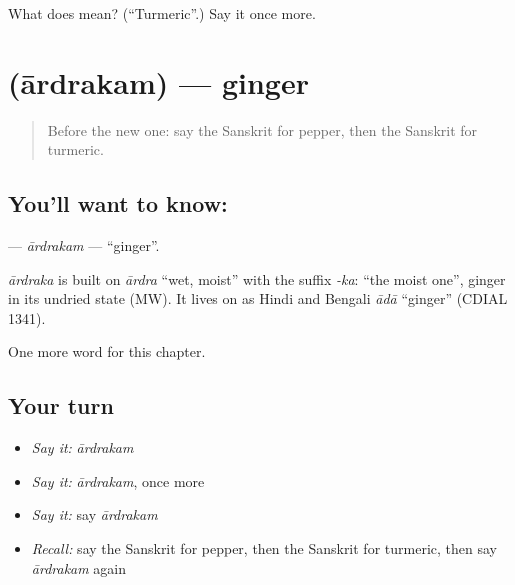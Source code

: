 \begin{tcolorbox}[breakable,colback=teal!4,colframe=teal!35!black,title={Before you move on}]
What does  mean? (\textquotedblleft{}Turmeric\textquotedblright{}.) Say it once more.
\end{tcolorbox}
\section[\texorpdfstring{\sk{आर्द्रकम्} (ārdrakam)}{आर्द्रकम् (ārdrakam)}]{ (ārdrakam) — ginger}

\label{lesson:SA-C107-ardrakam}



\begin{quote}
Before the new one: say the Sanskrit for pepper, then the Sanskrit for turmeric.
\end{quote}

\subsection*{You'll want to know: }
\textbf{} — \emph{ārdrakam} — \textquotedblleft{}ginger\textquotedblright{}.

\begin{cousinweb}
\emph{ārdraka} is built on \emph{ārdra} \textquotedblleft{}wet, moist\textquotedblright{} with the suffix \emph{-ka}: \textquotedblleft{}the moist one\textquotedblright{}, ginger in its undried state (MW). It lives on as Hindi and Bengali \emph{ādā} \textquotedblleft{}ginger\textquotedblright{} (CDIAL 1341).
\end{cousinweb}

\begin{grammarlens}[title={What you've built}]
One more word for this chapter.
\end{grammarlens}

\subsection*{Your turn}
\begin{itemize}
\raggedright
  \item \emph{Say it:} \emph{ārdrakam}
  \item \emph{Say it:} \emph{ārdrakam}, once more
  \item \emph{Say it:} say \emph{ārdrakam}
  \item \emph{Recall:} say the Sanskrit for pepper, then the Sanskrit for turmeric, then say \emph{ārdrakam} again
\end{itemize}

